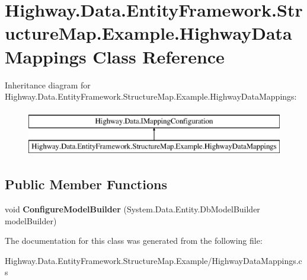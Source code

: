 \hypertarget{class_highway_1_1_data_1_1_entity_framework_1_1_structure_map_1_1_example_1_1_highway_data_mappings}{\section{Highway.\-Data.\-Entity\-Framework.\-Structure\-Map.\-Example.\-Highway\-Data\-Mappings Class Reference}
\label{class_highway_1_1_data_1_1_entity_framework_1_1_structure_map_1_1_example_1_1_highway_data_mappings}
}
Inheritance diagram for Highway.\-Data.\-Entity\-Framework.\-Structure\-Map.\-Example.\-Highway\-Data\-Mappings\-:\begin{figure}[H]
\begin{center}
\leavevmode
\includegraphics[height=2.000000cm]{class_highway_1_1_data_1_1_entity_framework_1_1_structure_map_1_1_example_1_1_highway_data_mappings}
\end{center}
\end{figure}
\subsection*{Public Member Functions}
\begin{DoxyCompactItemize}
\item 
\hypertarget{class_highway_1_1_data_1_1_entity_framework_1_1_structure_map_1_1_example_1_1_highway_data_mappings_a53b1679f302cc7b5b143f07e1c60f5b8}{void {\bfseries Configure\-Model\-Builder} (System.\-Data.\-Entity.\-Db\-Model\-Builder model\-Builder)}\label{class_highway_1_1_data_1_1_entity_framework_1_1_structure_map_1_1_example_1_1_highway_data_mappings_a53b1679f302cc7b5b143f07e1c60f5b8}

\end{DoxyCompactItemize}


The documentation for this class was generated from the following file\-:\begin{DoxyCompactItemize}
\item 
Highway.\-Data.\-Entity\-Framework.\-Structure\-Map.\-Example/Highway\-Data\-Mappings.\-cs\end{DoxyCompactItemize}
